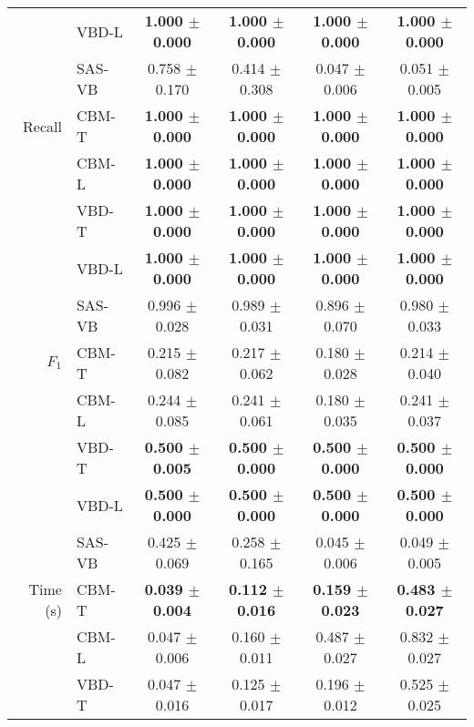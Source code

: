 \documentclass[11pt]{article}
\numberwithin{equation}{section}
\begin{document}
\begin{table}
{\begin{tabular}{r|l|cccc}
              & VBD-L & \textbf{1.000 $\pm$ 0.000} & \textbf{1.000 $\pm$ 0.000} & \textbf{1.000 $\pm$ 0.000} & \textbf{1.000 $\pm$ 0.000}\\
              & SAS-VB  & 0.758 $\pm$ 0.170          & 0.414 $\pm$ 0.308          & 0.047 $\pm$ 0.006          & 0.051 $\pm$ 0.005\\
\hline
Recall        & CBM-T   & \textbf{1.000 $\pm$ 0.000} & \textbf{1.000 $\pm$ 0.000} & \textbf{1.000 $\pm$ 0.000} & \textbf{1.000 $\pm$ 0.000}\\
              & CBM-L   & \textbf{1.000 $\pm$ 0.000} & \textbf{1.000 $\pm$ 0.000} & \textbf{1.000 $\pm$ 0.000} & \textbf{1.000 $\pm$ 0.000}\\
              & VBD-T & \textbf{1.000 $\pm$ 0.000} & \textbf{1.000 $\pm$ 0.000} & \textbf{1.000 $\pm$ 0.000} & \textbf{1.000 $\pm$ 0.000}\\
              & VBD-L & \textbf{1.000 $\pm$ 0.000} & \textbf{1.000 $\pm$ 0.000} & \textbf{1.000 $\pm$ 0.000} & \textbf{1.000 $\pm$ 0.000}\\
              & SAS-VB  & 0.996 $\pm$ 0.028          & 0.989 $\pm$ 0.031          & 0.896 $\pm$ 0.070          & 0.980 $\pm$ 0.033\\
\hline
$F_1$         & CBM-T   & 0.215 $\pm$ 0.082          & 0.217 $\pm$ 0.062          & 0.180 $\pm$ 0.028          & 0.214 $\pm$ 0.040\\
              & CBM-L   & 0.244 $\pm$ 0.085          & 0.241 $\pm$ 0.061          & 0.180 $\pm$ 0.035          & 0.241 $\pm$ 0.037\\
              & VBD-T & \textbf{0.500 $\pm$ 0.005} & \textbf{0.500 $\pm$ 0.000} & \textbf{0.500 $\pm$ 0.000} & \textbf{0.500 $\pm$ 0.000}\\
              & VBD-L & \textbf{0.500 $\pm$ 0.000} & \textbf{0.500 $\pm$ 0.000} & \textbf{0.500 $\pm$ 0.000} & \textbf{0.500 $\pm$ 0.000}\\
              & SAS-VB  & 0.425 $\pm$ 0.069          & 0.258 $\pm$ 0.165          & 0.045 $\pm$ 0.006          & 0.049 $\pm$ 0.005\\
\hline
Time (s)      & CBM-T   & \textbf{0.039 $\pm$ 0.004} & \textbf{0.112 $\pm$ 0.016} & \textbf{0.159 $\pm$ 0.023} & \textbf{0.483 $\pm$ 0.027}\\
              & CBM-L   & 0.047 $\pm$ 0.006          & 0.160 $\pm$ 0.011          & 0.487 $\pm$ 0.027          & 0.832 $\pm$ 0.027\\
              & VBD-T & 0.047 $\pm$ 0.016          & 0.125 $\pm$ 0.017          & 0.196 $\pm$ 0.012          & 0.525 $\pm$ 0.025\\

\end{tabular}}
\end{table}
\end{document}
